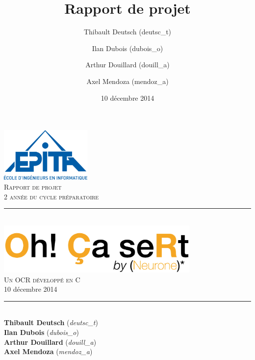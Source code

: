 \documentclass[11pt]{report}
\title{Rapport de projet}
\author{Thibault Deutsch (deutsc\_t) \and Ilan Dubois (dubois\_o) \and Arthur Douillard (douill\_a) \and Axel Mendoza (mendoz\_a)}
\date{10 décembre 2014}
\begin{document}
\renewcommand{\labelitemi}{$\bullet$}

\begin{titlepage}
\newcommand{\HRule}{\rule{\linewidth}{0.5mm}} %

\flushright
\includegraphics[width = 4.5cm]{epita.png}\\[0.5cm] %

\textsc{\Large Rapport de projet}\\[0.15cm] %
\textsc{\large 2 année du cycle préparatoire}\\[3cm] %

\center
\HRule \\[0.5cm]
\includegraphics[width = 10cm]{logo.png}\\[1cm]
\textsc{\Large Un OCR développé en C}\\[0.1cm]
\large 10 décembre 2014\\[0.1cm]
\HRule \\[3cm]

\Large
\textbf{Thibault Deutsch} (\emph{deutsc\_t}) \\
\textbf{Ilan Dubois} (\emph{dubois\_o}) \\
\textbf{Arthur Douillard} (\emph{douill\_a}) \\
\textbf{Axel Mendoza} (\emph{mendoz\_a})\\[2cm]

\vfill %

\end{titlepage}
\end{document}
